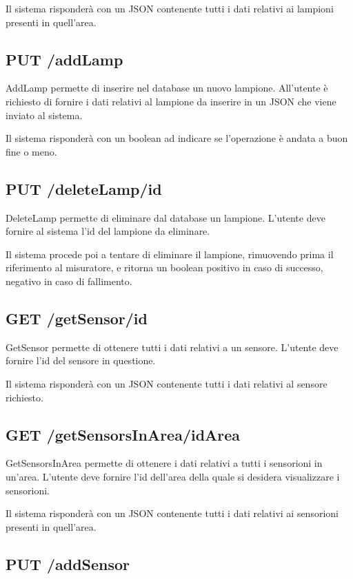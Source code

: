 Il sistema risponderà con un JSON contenente tutti i dati relativi ai lampioni presenti in quell'area.

\subsection{ PUT /addLamp}

AddLamp permette di inserire nel database un nuovo lampione. All'utente è richiesto di fornire i dati relativi al lampione da inserire in un JSON che viene inviato al sistema.

Il sistema risponderà con un boolean ad indicare se l'operazione è andata a buon fine o meno.

\subsection{ PUT /deleteLamp/id}

DeleteLamp permette di eliminare dal database un lampione. L'utente deve fornire al sistema l'id del lampione da eliminare.

Il sistema procede poi a tentare di eliminare il lampione, rimuovendo prima il riferimento al misuratore, e ritorna un boolean positivo in caso di successo, negativo in caso di fallimento.

\subsection{ GET /getSensor/id}

GetSensor permette di ottenere tutti i dati relativi a un sensore. L'utente deve fornire l'id del sensore in questione.

Il sistema risponderà con un JSON contenente tutti i dati relativi al sensore richiesto.

\subsection{ GET /getSensorsInArea/idArea}

GetSensorsInArea permette di ottenere i dati relativi a tutti i sensorioni in un'area. L'utente deve fornire l'id dell'area della quale si desidera visualizzare i sensorioni.

Il sistema risponderà con un JSON contenente tutti i dati relativi ai sensorioni presenti in quell'area.

\subsection{ PUT /addSensor}

